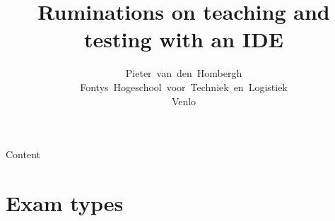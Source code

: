 \documentclass{beamer}
\author[HOM]{Pieter~van~den~Hombergh\\Fontys~Hogeschool~voor~Techniek~en~Logistiek\\Venlo}
\title{Ruminations on teaching and testing with an IDE}
\begin{document}
\frame{\titlepage}
\begin{frame}{Content}
  \tableofcontents
\end{frame}




\section{Exam types}
\end{document}
